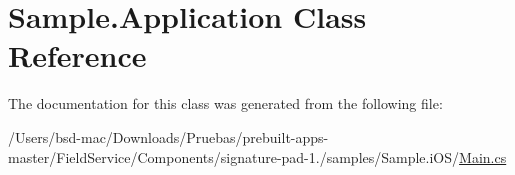 \hypertarget{class_sample_1_1_application}{\section{Sample.\+Application Class Reference}
\label{class_sample_1_1_application}
}


The documentation for this class was generated from the following file\+:\begin{DoxyCompactItemize}
\item 
/\+Users/bsd-\/mac/\+Downloads/\+Pruebas/prebuilt-\/apps-\/master/\+Field\+Service/\+Components/signature-\/pad-\/1./samples/\+Sample.\+i\+O\+S/\hyperlink{_components_2signature-pad-1_82_2samples_2_sample_8i_o_s_2_main_8cs}{Main.\+cs}\end{DoxyCompactItemize}
